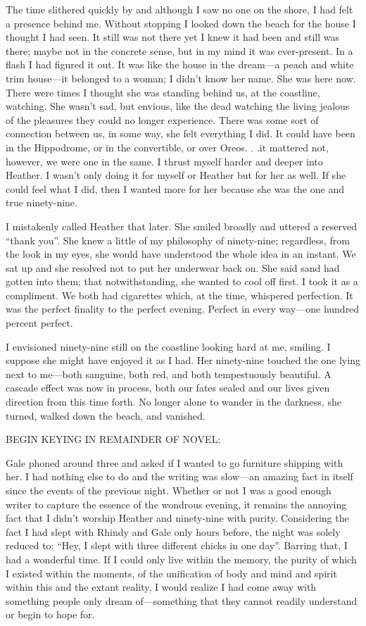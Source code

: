 The time slithered quickly by and although I saw no one on the shore, I
had felt a presence behind me. Without stopping I looked down the beach
for the house I thought I had seen. It still was not there yet I knew it
had been and still was there; maybe not in the concrete sense, but in my
mind it was ever-present. In a flash I had figured it out. It was like
the house in the dream---a peach and white trim house---it belonged to a
woman; I didn't know her name. She was here now. There were times I
thought she was standing behind us, at the coastline, watching. She
wasn't sad, but envious, like the dead watching the living jealous of
the pleasures they could no longer experience. There was some sort of
connection between us, in some way, she felt everything I did. It could
have been in the Hippodrome, or in the convertible, or over Oreos. . .it
mattered not, however, we were one in the same. I thrust myself harder
and deeper into Heather. I wasn't only doing it for myself or Heather
but for her as well. If she could feel what I did, then I wanted more
for her because she was the one and true ninety-nine.

I mistakenly called Heather that later. She smiled broadly and uttered a
reserved ``thank you''. She knew a little of my philosophy of
ninety-nine; regardless, from the look in my eyes, she would have
understood the whole idea in an instant. We sat up and she resolved not
to put her underwear back on. She said sand had gotten into them; that
notwithstanding, she wanted to cool off first. I took it as a
compliment. We both had cigarettes which, at the time, whispered
perfection. It was the perfect finality to the perfect evening. Perfect
in every way---one hundred percent perfect.

I envisioned ninety-nine still on the coastline looking hard at me,
smiling. I suppose she might have enjoyed it as I had. Her ninety-nine
touched the one lying next to me---both sanguine, both red, and both
tempestuously beautiful. A cascade effect was now in process, both our
fates sealed and our lives given direction from this time forth. No
longer alone to wander in the darkness, she turned, walked down the
beach, and vanished.

BEGIN KEYING IN REMAINDER OF NOVEL:

Gale phoned around three and asked if I wanted to go furniture shipping
with her. I had nothing else to do and the writing was slow---an amazing
fact in itself since the events of the previous night. Whether or not I
was a good enough writer to capture the essence of the wondrous evening,
it remains the annoying fact that I didn't worship Heather and
ninety-nine with purity. Considering the fact I had slept with Rhindy
and Gale only hours before, the night was solely reduced to: ``Hey, I
slept with three different chicks in one day''. Barring that, I had a
wonderful time. If I could only live within the memory, the purity of
which I existed within the moments, of the unification of body and mind
and spirit within this and the extant reality, I would realize I had
come away with something people only dream of---something that they
cannot readily understand or begin to hope for.

